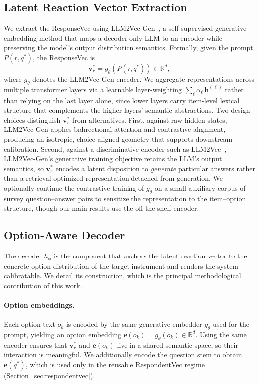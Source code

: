 \subsection{Latent Reaction Vector Extraction}
\label{sec:extraction}

We extract the ResponseVec using LLM2Vec-Gen~\citep{behnamghader2026llmvecgen}, a self-supervised generative embedding method that maps a decoder-only LLM to an encoder while preserving the model's output distribution semantics. Formally, given the prompt $P(r,q^\ast)$, the ResponseVec is
\begin{equation}
\mathbf{v}^\ast_r = g_\theta(P(r,q^\ast)) \in \mathbb{R}^d,
\end{equation}
where $g_\theta$ denotes the LLM2Vec-Gen encoder. We aggregate representations across multiple transformer layers via a learnable layer-weighting $\sum_{\ell} \alpha_\ell \, \mathbf{h}^{(\ell)}$ rather than relying on the last layer alone, since lower layers carry item-level lexical structure that complements the higher layers' semantic abstractions. Two design choices distinguish $\mathbf{v}^\ast_r$ from alternatives. First, against raw hidden states, LLM2Vec-Gen applies bidirectional attention and contrastive alignment, producing an isotropic, choice-aligned geometry that supports downstream calibration. Second, against a discriminative encoder such as LLM2Vec~\citep{behnamghader2024llmvec}, LLM2Vec-Gen's generative training objective retains the LLM's output semantics, so $\mathbf{v}^\ast_r$ encodes a latent disposition to \emph{generate} particular answers rather than a retrieval-optimized representation detached from generation. We optionally continue the contrastive training of $g_\theta$ on a small auxiliary corpus of survey question--answer pairs to sensitize the representation to the item--option structure, though our main results use the off-the-shelf encoder.

\subsection{Option-Aware Decoder}
\label{sec:decoder}

The decoder $h_\phi$ is the component that anchors the latent reaction vector to the concrete option distribution of the target instrument and renders the system calibratable. We detail its construction, which is the principal methodological contribution of this work.

\paragraph{Option embeddings.} Each option text $o_k$ is encoded by the same generative embedder $g_\theta$ used for the prompt, yielding an option embedding $\mathbf{e}(o_k) = g_\theta(o_k) \in \mathbb{R}^d$. Using the same encoder ensures that $\mathbf{v}^\ast_r$ and $\mathbf{e}(o_k)$ live in a shared semantic space, so their interaction is meaningful. We additionally encode the question stem to obtain $\mathbf{e}(q^\ast)$, which is used only in the reusable RespondentVec regime (Section~\ref{sec:respondentvec}).

